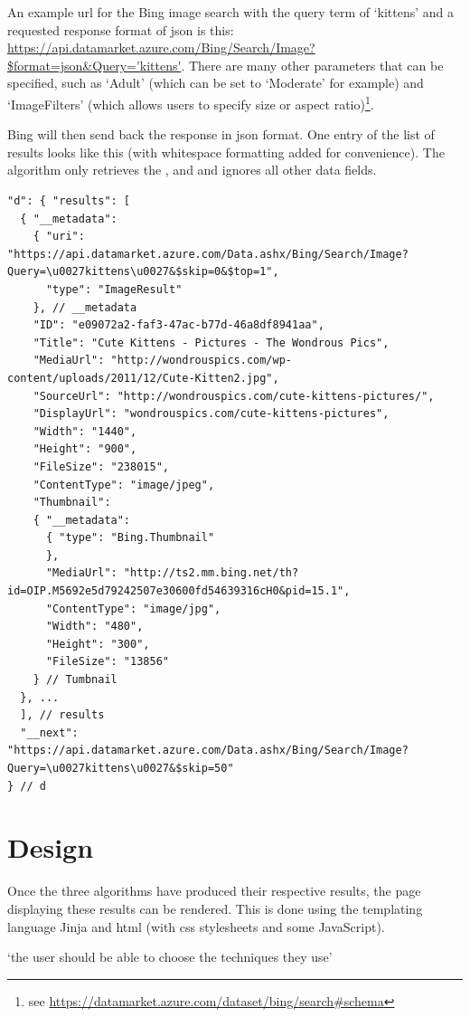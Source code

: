 An example \gls{url} for the Bing image search with the query term of `kittens' and a requested response format of \gls{json} is this:
\url{https://api.datamarket.azure.com/Bing/Search/Image?$format=json&Query='kittens'}. There are many other parameters that can be specified, such as `Adult' (which can be set to `Moderate' for example) and `ImageFilters' (which allows users to specify size or aspect ratio)\footnote{see \url{https://datamarket.azure.com/dataset/bing/search\#schema}}.

Bing will then send back the response in \gls{json} format. One entry of the list of results looks like this (with whitespace formatting added for convenience). The algorithm only retrieves the ,  and  and ignores all other data fields.

\begin{verbatim}
"d": { "results": [
  { "__metadata":
    { "uri": "https://api.datamarket.azure.com/Data.ashx/Bing/Search/Image?Query=\u0027kittens\u0027&$skip=0&$top=1",
      "type": "ImageResult"
    }, // __metadata
    "ID": "e09072a2-faf3-47ac-b77d-46a8df8941aa",
    "Title": "Cute Kittens - Pictures - The Wondrous Pics",
    "MediaUrl": "http://wondrouspics.com/wp-content/uploads/2011/12/Cute-Kitten2.jpg",
    "SourceUrl": "http://wondrouspics.com/cute-kittens-pictures/",
    "DisplayUrl": "wondrouspics.com/cute-kittens-pictures",
    "Width": "1440",
    "Height": "900",
    "FileSize": "238015",
    "ContentType": "image/jpeg",
    "Thumbnail":
    { "__metadata":
      { "type": "Bing.Thumbnail"
      },
      "MediaUrl": "http://ts2.mm.bing.net/th?id=OIP.M5692e5d79242507e30600fd54639316cH0&pid=15.1",
      "ContentType": "image/jpg",
      "Width": "480",
      "Height": "300",
      "FileSize": "13856"
    } // Tumbnail
  }, ...
  ], // results
  "__next": "https://api.datamarket.azure.com/Data.ashx/Bing/Search/Image?Query=\u0027kittens\u0027&$skip=50"
} // d
\end{verbatim}


\section{Design}

Once the three algorithms have produced their respective results, the page displaying these results can be rendered. This is done using the templating language Jinja and \gls{html} (with \gls{css} stylesheets and some JavaScript).

`the user should be able to choose the techniques they use' \autocite{Hendler2011}



